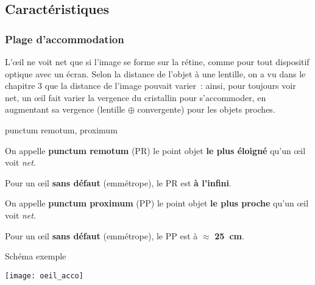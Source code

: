 \documentclass[../main/main.tex]{subfiles}
\begin{document}
\subsection{Caractéristiques}

\subsubsection{Plage d'accommodation}
L'œil ne voit net que si l'image se forme sur la rétine, comme pour tout
dispositif optique avec un écran. Selon la distance de l'objet à une
lentille, on a vu dans le chapitre 3 que la distance de l'image pouvait varier~:
ainsi, pour toujours voir net, un œil fait varier la vergence du cristallin pour
s'accommoder, en augmentant sa vergence (lentille $\oplus$ convergente) pour les
objets proches.
\begin{tcbraster}[raster columns=2, raster equal height=rows]
    \begin{defi}[label=def:pppr]{{punctum remotum, proximum}}

            On appelle \textbf{punctum remotum} (PR) le point objet \textbf{le plus
            éloigné} qu'un œil voit \textit{net}.

            Pour un œil \textbf{sans défaut} (emmétrope), le PR est \textbf{à
            l'infini}.

        \tcblower
            On appelle \textbf{punctum proximum} (PP) le point objet \textbf{le plus
            proche} qu'un œil voit \textit{net}.


            Pour un œil \textbf{sans défaut} (emmétrope), le PP est à $\approx$
            \textbf{\SI{25}{cm}}.

    \end{defi}
    \begin{NCexem}[width=\linewidth]{Schéma exemple}
        \begin{center}
            \texttt{[image: oeil\_acco]}
            \label{fig:oeil_acco}
        \end{center}
    \end{NCexem}
\end{tcbraster}
\end{document}
